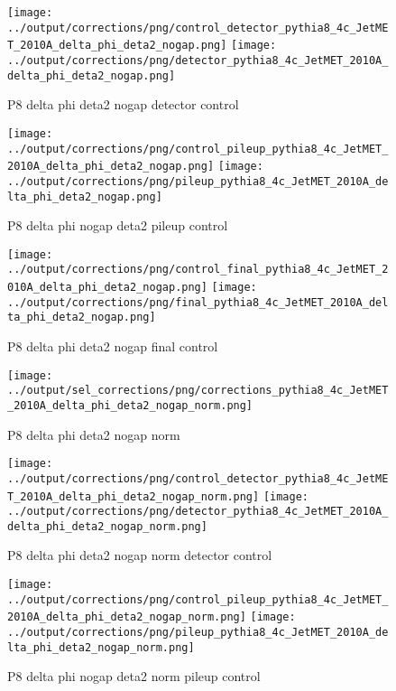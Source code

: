 \documentclass[11pt]{book}
\begin{document}
\begin{figure}[ht]
\centering
\texttt{[image: ../output/corrections/png/control\_detector\_pythia8\_4c\_JetMET\_2010A\_delta\_phi\_deta2\_nogap.png]}
\texttt{[image: ../output/corrections/png/detector\_pythia8\_4c\_JetMET\_2010A\_delta\_phi\_deta2\_nogap.png]}
\caption{P8 delta phi deta2 nogap detector control}
\label{fig:p8_JetMET_2010A_delta_phi_deta2_nogap_detector_control}
\end{figure}

\begin{figure}[ht]
\centering
\texttt{[image: ../output/corrections/png/control\_pileup\_pythia8\_4c\_JetMET\_2010A\_delta\_phi\_deta2\_nogap.png]}
\texttt{[image: ../output/corrections/png/pileup\_pythia8\_4c\_JetMET\_2010A\_delta\_phi\_deta2\_nogap.png]}
\caption{P8 delta phi nogap deta2 pileup control}
\label{fig:p8_JetMET_2010A_delta_phi_deta2_nogap_pileup_control}
\end{figure}


\begin{figure}[ht]
\centering
\texttt{[image: ../output/corrections/png/control\_final\_pythia8\_4c\_JetMET\_2010A\_delta\_phi\_deta2\_nogap.png]}
\texttt{[image: ../output/corrections/png/final\_pythia8\_4c\_JetMET\_2010A\_delta\_phi\_deta2\_nogap.png]}
\caption{P8 delta phi deta2 nogap final control}
\label{fig:p8_JetMET_2010A_delta_phi_deta2_nogap_final_control}
\end{figure}

\begin{figure}[ht]
\centering
\texttt{[image: ../output/sel\_corrections/png/corrections\_pythia8\_4c\_JetMET\_2010A\_delta\_phi\_deta2\_nogap\_norm.png]}
\caption{P8 delta phi deta2 nogap norm}
\label{fig:p8_JetMET_2010A_delta_phi_deta2_nogap_norm}
\end{figure}

\begin{figure}[ht]
\centering
\texttt{[image: ../output/corrections/png/control\_detector\_pythia8\_4c\_JetMET\_2010A\_delta\_phi\_deta2\_nogap\_norm.png]}
\texttt{[image: ../output/corrections/png/detector\_pythia8\_4c\_JetMET\_2010A\_delta\_phi\_deta2\_nogap\_norm.png]}
\caption{P8 delta phi deta2 nogap norm detector control}
\label{fig:p8_JetMET_2010A_delta_phi_deta2_nogap_norm_detector_control}
\end{figure}

\begin{figure}[ht]
\centering
\texttt{[image: ../output/corrections/png/control\_pileup\_pythia8\_4c\_JetMET\_2010A\_delta\_phi\_deta2\_nogap\_norm.png]}
\texttt{[image: ../output/corrections/png/pileup\_pythia8\_4c\_JetMET\_2010A\_delta\_phi\_deta2\_nogap\_norm.png]}
\caption{P8 delta phi nogap deta2 norm pileup control}
\label{fig:p8_JetMET_2010A_delta_phi_deta2_nogap_norm_pileup_control}
\end{figure}
\end{document}
